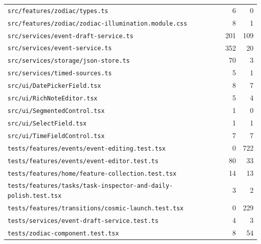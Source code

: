 \begin{longtable}{p{}rr}
\texttt{src/\allowbreak{}features/\allowbreak{}zodiac/\allowbreak{}types.ts} & 6 & 0 \\
\texttt{src/\allowbreak{}features/\allowbreak{}zodiac/\allowbreak{}zodiac-illumination.module.css} & 8 & 1 \\
\texttt{src/\allowbreak{}services/\allowbreak{}event-draft-service.ts} & 201 & 109 \\
\texttt{src/\allowbreak{}services/\allowbreak{}event-service.ts} & 352 & 20 \\
\texttt{src/\allowbreak{}services/\allowbreak{}storage/\allowbreak{}json-store.ts} & 70 & 3 \\
\texttt{src/\allowbreak{}services/\allowbreak{}timed-sources.ts} & 5 & 1 \\
\texttt{src/\allowbreak{}ui/\allowbreak{}DatePickerField.tsx} & 8 & 7 \\
\texttt{src/\allowbreak{}ui/\allowbreak{}RichNoteEditor.tsx} & 5 & 4 \\
\texttt{src/\allowbreak{}ui/\allowbreak{}SegmentedControl.tsx} & 1 & 0 \\
\texttt{src/\allowbreak{}ui/\allowbreak{}SelectField.tsx} & 1 & 1 \\
\texttt{src/\allowbreak{}ui/\allowbreak{}TimeFieldControl.tsx} & 7 & 7 \\
\texttt{tests/\allowbreak{}features/\allowbreak{}events/\allowbreak{}event-editing.test.tsx} & 0 & 722 \\
\texttt{tests/\allowbreak{}features/\allowbreak{}events/\allowbreak{}event-editor.test.ts} & 80 & 33 \\
\texttt{tests/\allowbreak{}features/\allowbreak{}home/\allowbreak{}feature-collection.test.tsx} & 14 & 13 \\
\texttt{tests/\allowbreak{}features/\allowbreak{}tasks/\allowbreak{}task-inspector-and-daily-polish.test.tsx} & 3 & 2 \\
\texttt{tests/\allowbreak{}features/\allowbreak{}transitions/\allowbreak{}cosmic-launch.test.tsx} & 0 & 229 \\
\texttt{tests/\allowbreak{}services/\allowbreak{}event-draft-service.test.ts} & 4 & 3 \\
\texttt{tests/\allowbreak{}zodiac-component.test.tsx} & 8 & 54 \\
\bottomrule
\end{longtable}
